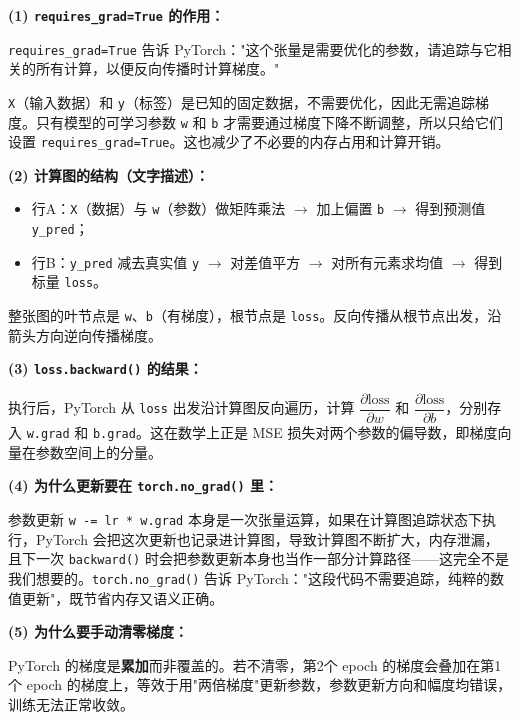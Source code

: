 \documentclass[a4paper,11pt]{ctexart}
\begin{document}
\begin{solutionbox}[参考答案与详细解析]
    \textbf{(1) \texttt{requires\_grad=True} 的作用：}

    \texttt{requires\_grad=True} 告诉 PyTorch："这个张量是需要优化的参数，请追踪与它相关的所有计算，以便反向传播时计算梯度。"

    \texttt{X}（输入数据）和 \texttt{y}（标签）是已知的固定数据，不需要优化，因此无需追踪梯度。只有模型的可学习参数 \texttt{w} 和 \texttt{b} 才需要通过梯度下降不断调整，所以只给它们设置 \texttt{requires\_grad=True}。这也减少了不必要的内存占用和计算开销。

    \textbf{(2) 计算图的结构（文字描述）：}

    \begin{itemize}
        \item 行A：\texttt{X}（数据）与 \texttt{w}（参数）做矩阵乘法 $\rightarrow$ 加上偏置 \texttt{b} $\rightarrow$ 得到预测值 \texttt{y\_pred}；
        \item 行B：\texttt{y\_pred} 减去真实值 \texttt{y} $\rightarrow$ 对差值平方 $\rightarrow$ 对所有元素求均值 $\rightarrow$ 得到标量 \texttt{loss}。
    \end{itemize}

    整张图的叶节点是 \texttt{w}、\texttt{b}（有梯度），根节点是 \texttt{loss}。反向传播从根节点出发，沿箭头方向逆向传播梯度。

    \textbf{(3) \texttt{loss.backward()} 的结果：}

    执行后，PyTorch 从 \texttt{loss} 出发沿计算图反向遍历，计算 $\dfrac{\partial \text{loss}}{\partial w}$ 和 $\dfrac{\partial \text{loss}}{\partial b}$，分别存入 \texttt{w.grad} 和 \texttt{b.grad}。这在数学上正是 MSE 损失对两个参数的偏导数，即梯度向量在参数空间上的分量。

    \textbf{(4) 为什么更新要在 \texttt{torch.no\_grad()} 里：}

    参数更新 \texttt{w -= lr * w.grad} 本身是一次张量运算，如果在计算图追踪状态下执行，PyTorch 会把这次更新也记录进计算图，导致计算图不断扩大，内存泄漏，且下一次 \texttt{backward()} 时会把参数更新本身也当作一部分计算路径——这完全不是我们想要的。\texttt{torch.no\_grad()} 告诉 PyTorch："这段代码不需要追踪，纯粹的数值更新"，既节省内存又语义正确。

    \textbf{(5) 为什么要手动清零梯度：}

    PyTorch 的梯度是\textbf{累加}而非覆盖的。若不清零，第2个 epoch 的梯度会叠加在第1个 epoch 的梯度上，等效于用"两倍梯度"更新参数，参数更新方向和幅度均错误，训练无法正常收敛。


\end{solutionbox}
\end{document}
